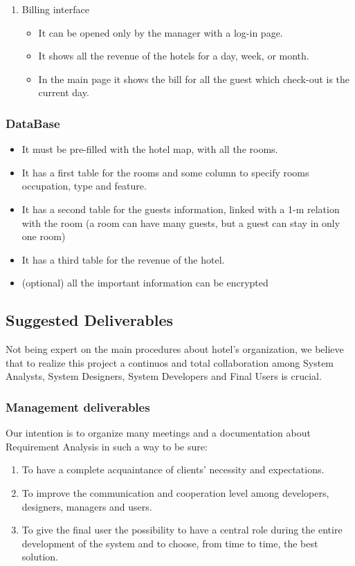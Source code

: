 \begin{enumerate}
\item Billing interface
    \begin{itemize}
		\item It can be opened only by the manager with a log-in page.
		\item It shows all the revenue of the hotels for a day, week, or month.
		\item In the main page it shows the bill for all the guest which check-out is the current day.
    \end{itemize}

\end{enumerate}

\subsubsection{DataBase}
    \begin{itemize}
	\item It must be pre-filled with the hotel map, with all the rooms.
	\item It has a first table for the rooms and some column to specify rooms occupation, type and feature.
	\item It has a second table for the guests information, linked with a 1-m relation with the room (a room can have many guests, but a guest can stay in only one room)
	\item It has a third table for the revenue of the hotel.
	\item (optional) all the important information can be encrypted
    \end{itemize}
    
\subsection{Suggested Deliverables}

Not being expert on the main procedures about hotel’s organization, we believe that to realize this project a continuos and total collaboration among System Analysts, System Designers, System Developers and Final Users is crucial.

\subsubsection{Management deliverables}

Our intention is to organize many meetings and a documentation about Requirement Analysis in such a way to be sure:
\begin{enumerate}
	\item To have a complete acquaintance of clients’ necessity and expectations.
	\item To improve the communication and cooperation level among developers, designers, managers and users.
	\item To give the final user the possibility to have a central role during the entire development of the system and to choose, from time to time, the best solution.
\end{enumerate}

